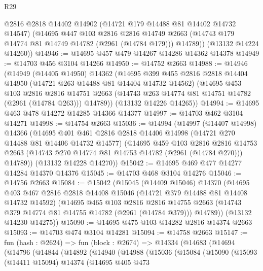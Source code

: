 \begin{lexlean}{R29}
\begin{coremodule}
        @2816
        @2818
        @14402
        @14902
        (@14721 @179 @14488 @81 @14402 @14732 @14547)
        (@14695
          @447
          @103
          @2816
          @2816
          @14749
          @2663
          (@14743 @179 @14774 @81 @14749 @14782 (@2961 (@14784 @179)))
          @14789))
      (@13132 @14224 @14260))
@14946 := @14695 @457 @479 @14267 @14286 @14362 @14378
@14949 := @14703 @456 @3104 @14266
@14950 := @14752 @2663
@14988 := @14946
    (@14949
      (@14405 @14950)
      @14362
      (@14695
        @399
        @455
        @2816
        @2818
        @14404
        @14950
        (@14721 @263 @14488 @81 @14404 @14732 @14562)
        (@14695
          @453
          @103
          @2816
          @2816
          @14751
          @2663
          (@14743 @263 @14774 @81 @14751 @14782 (@2961 (@14784 @263)))
          @14789))
      (@13132 @14226 @14265))
@14994 := @14695 @463 @478 @14272 @14285 @14366 @14377
@14997 := @14703 @462 @3104 @14271
@14998 := @14754 @2663
@15036 := @14994
    (@14997
      (@14407 @14998)
      @14366
      (@14695
        @401
        @461
        @2816
        @2818
        @14406
        @14998
        (@14721 @270 @14488 @81 @14406 @14732 @14577)
        (@14695
          @459
          @103
          @2816
          @2816
          @14753
          @2663
          (@14743 @270 @14774 @81 @14753 @14782 (@2961 (@14784 @270)))
          @14789))
      (@13132 @14228 @14270))
@15042 := @14695 @469 @477 @14277 @14284 @14370 @14376
@15045 := @14703 @468 @3104 @14276
@15046 := @14756 @2663
@15084 := @15042
    (@15045
      (@14409 @15046)
      @14370
      (@14695
        @403
        @467
        @2816
        @2818
        @14408
        @15046
        (@14721 @379 @14488 @81 @14408 @14732 @14592)
        (@14695
          @465
          @103
          @2816
          @2816
          @14755
          @2663
          (@14743 @379 @14774 @81 @14755 @14782 (@2961 (@14784 @379)))
          @14789))
      (@13132 @14230 @14275))
@15090 := @14695 @475 @103 @14282 @2816 @14374 @2663
@15093 := @14703 @474 @3104 @14281
@15094 := @14758 @2663
@15147 := fun (hash : @2624) =>
  fun (block : @2674) =>
  @14334
    (@14683
      (@14694
        (@14796
          (@14844
            (@14892
              (@14940
                (@14988
                  (@15036
                    (@15084
                      (@15090
                        (@15093
                          (@14411 @15094)
                          @14374
                          (@14695
                            @405
                            @473

\end{coremodule}
\end{lexlean}
